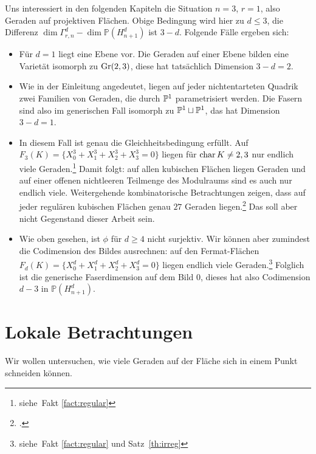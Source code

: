 Uns interessiert in den folgenden Kapiteln die Situation $n=3$, $r=1$, also Geraden auf projektiven Flächen. Obige Bedingung wird hier zu $d \leq 3$, die Differenz $\dim \Gamma_{r,n}^d - \dim \mathbb P(H_{n+1}^d)$ ist $3-d$. Folgende Fälle ergeben sich:
\begin{itemize}
\item Für $d=1$ liegt eine Ebene vor. Die Geraden auf einer Ebene bilden eine Varietät isomorph zu $\grass 2/3$, diese hat tatsächlich Dimension $3-d = 2$.
\item Wie in der Einleitung angedeutet, liegen auf jeder nichtentarteten Quadrik zwei Familien von Geraden, die durch $\mathbb P^{1}$ parametrisiert werden. Die Fasern sind also im generischen Fall isomorph zu $\mathbb P^{1} \sqcup \mathbb P^{1}$, das hat Dimension $3-d = 1$.
\item In diesem Fall ist genau die Gleichheitsbedingung erfüllt. Auf $F_3(K) = \{X_0^3 + X_1^3 + X_2^3 + X_3^3 = 0\}$ liegen für $\operatorname{char} K \neq 2,3$ nur endlich viele Geraden.\footnote{siehe~Fakt \ref{fact:regular}} Damit folgt: auf allen kubischen Flächen liegen Geraden und auf einer offenen nichtleeren Teilmenge des Modulraums sind es auch nur endlich viele. Weitergehende kombinatorische Betrachtungen zeigen, dass auf jeder regulären kubischen Flächen genau $27$ Geraden liegen.\footcite[siehe etwa][]{Henderson} Das soll aber nicht Gegenstand dieser Arbeit sein.
\item Wie oben gesehen, ist $\phi$ für $d \geq 4$ nicht surjektiv. Wir können aber zumindest die Codimension des Bildes ausrechnen: auf den Fermat-Flächen $F_d(K) = \{X_0^d + X_1^d + X_2^d + X_3^d = 0\}$ liegen endlich viele Geraden.\footnote{siehe~Fakt \ref{fact:regular} und Satz~\ref{th:irreg}} Folglich ist die generische Faserdimension auf dem Bild $0$, dieses hat also Codimension $d-3$ in $\mathbb P(H_{n+1}^d)$.
\end{itemize}

\section{Lokale Betrachtungen}
Wir wollen untersuchen, wie viele Geraden auf der Fläche sich in einem Punkt schneiden können.

